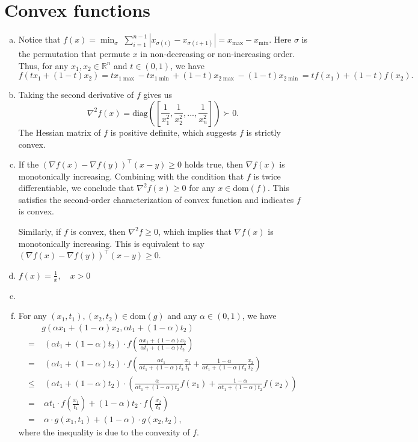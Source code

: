 \documentclass[12pt,letterpaper]{article}
\def\R{\mathbb{R}}
\def\dom{\mathrm{dom}}
\begin{document}
	\newpage
	\section{Convex functions}
	\begin{enumerate}[(a)]
	\item Notice that $f(x)=\min_\sigma \; \sum_{i=1}^{n-1} |x_{\sigma(i)} - x_{\sigma(i+1)}| = x_{\max} - x_{\min}$. Here $\sigma$ is the permutation that permute $x$ in non-decreasing or non-increasing order. Thus, for any $x_1,x_2 \in\R^n$ and $t\in(0,1)$, we have
	\begin{equation}
	f(tx_1+(1-t)x_2) = tx_{1\max} - tx_{1\min} + (1-t)x_{2\max} - (1-t)x_{2\min} = tf(x_1) + (1-t)f(x_2).
	\end{equation}
	
	\item Taking the second derivative of $f$ gives us
	\begin{equation}
	\nabla^2 f(x) = \text{diag}([\frac{1}{x_1^2}, \frac{1}{x_2^2}, ..., \frac{1}{x_n^2}]) \succ 0.
	\end{equation}
	The Hessian matrix of $f$ is positive definite, which suggests $f$ is strictly convex.
	
	\item If the $(\nabla f(x) - \nabla f(y))^\top (x-y) \geq 0$ holds true, then $\nabla f(x)$ is monotonically increasing. Combining with the condition that $f$ is twice differentiable, we conclude that $\nabla^2 f(x) \geq 0$ for any $x \in \dom(f)$. This satisfies the second-order characterization of convex function and indicates $f$ is convex.
	
	Similarly, if $f$ is convex, then $\nabla^2 f \geq 0$, which implies that $\nabla f(x)$ is monotonically increasing. This is equivalent to say $(\nabla f(x) - \nabla f(y))^\top (x-y) \geq 0$.
	 
	\item $f(x) = \frac{1}{x},\quad x>0$
	
	\item 
	
	\item For any $(x_1,t_1),(x_2,t_2)\in\dom(g)$ and any $\alpha \in (0,1)$, we have
	\begin{align*}
	&g(\alpha x_1 +(1-\alpha) x_2, \alpha t_1 + (1-\alpha) t_2)\\ 
	=&\; (\alpha t_1 + (1-\alpha) t_2)\cdot f\left(\frac{\alpha x_1 + (1-\alpha) x_2}{\alpha t_1 + (1-\alpha) t_2}\right) \\
	=&\; (\alpha t_1 + (1-\alpha) t_2)\cdot f\left(\frac{\alpha t_1}{\alpha t_1 + (1-\alpha) t_2} \frac{x_1}{t_1} + \frac{1-\alpha}{\alpha t_1 + (1-\alpha) t_2} \frac{x_2}{t_2}\right)\\
	\le&\; (\alpha t_1 + (1-\alpha) t_2) \cdot \left(\frac{\alpha}{\alpha t_1 + (1-\alpha) t_2} f(x_1) + \frac{1-\alpha}{\alpha t_1 + (1-\alpha) t_2}f(x_2)\right)\\
	=&\; \alpha t_1\cdot f\left(\frac{x_1}{t_1}\right) + (1-\alpha) t_2\cdot f\left(\frac{x_2}{t_2}\right)\\
	=&\; \alpha\cdot g(x_1,t_1) + (1-\alpha)\cdot g(x_2,t_2),
	\end{align*}
	where the inequality is due to the convexity of $f$.
	\end{enumerate}
	\newpage
\end{document}
